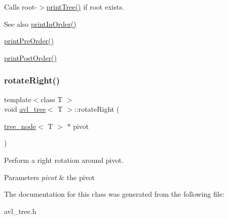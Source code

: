 Calls root-\/$>$\hyperlink{classavl__tree_ae067ad48ed35e1df18fdda1ed83c3d79}{print\+Tree()} if root exists. \begin{DoxySeeAlso}{See also}
\hyperlink{classavl__tree_a524ae6ac5d7f7c2399fb758aba84af80}{print\+In\+Order()} 

\hyperlink{classavl__tree_ac17fa1e4aa2f0f4b609a7b72c34bd2f6}{print\+Pre\+Order()} 

\hyperlink{classavl__tree_a5fb83061648947aeb6b540a5dee7ae13}{print\+Post\+Order()} 
\end{DoxySeeAlso}
\mbox{\label{classavl__tree_a924a12b6610a548c331e909b5a6d0855}} 
\subsubsection{\texorpdfstring{rotate\+Right()}{rotateRight()}}
{\footnotesize\ttfamily template$<$class T $>$ \\
void \hyperlink{classavl__tree}{avl\+\_\+tree}$<$ T $>$\+::rotate\+Right (\begin{DoxyParamCaption}\item[{\hyperlink{classtree__node}{tree\+\_\+node}$<$ T $>$ $\ast$}]{pivot }\end{DoxyParamCaption})}

Perform a right rotation around pivot. 
\begin{DoxyParams}{Parameters}
{\em pivot} & the pivot \\
\hline
\end{DoxyParams}


The documentation for this class was generated from the following file\+:\begin{DoxyCompactItemize}
\item 
avl\+\_\+tree.\+h\end{DoxyCompactItemize}
